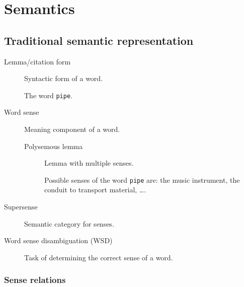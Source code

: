 \chapter{Semantics}


\section{Traditional semantic representation}

\begin{description}
    \item[Lemma/citation form] 
        Syntactic form of a word.

        \begin{example}
            The word \texttt{pipe}.
        \end{example}

    \item[Word sense] 
        Meaning component of a word.

        \begin{description}
            \item[Polysemous lemma] Lemma with multiple senses. 
            \begin{example}
                Possible senses of the word \texttt{pipe} are: the music instrument, the conduit to transport material, \dots.
            \end{example}
        \end{description}

    \item[Supersense] 
        Semantic category for senses.

    \item[Word sense disambiguation (WSD)] 
        Task of determining the correct sense of a word.
\end{description}


\subsection{Sense relations}

